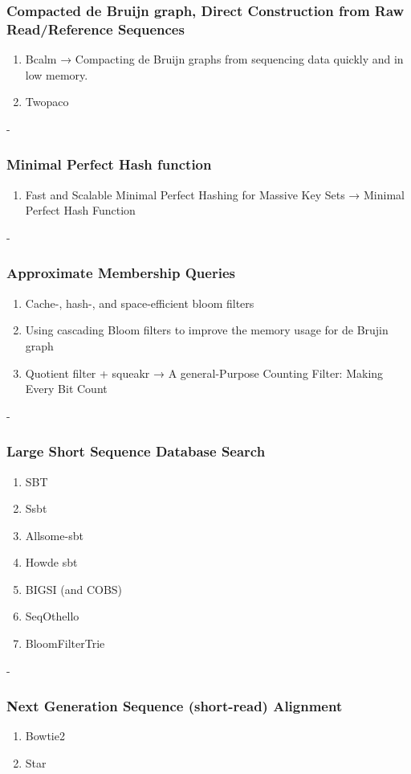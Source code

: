 \subsubsection{Compacted de Bruijn graph, Direct Construction from Raw Read/Reference Sequences}
\begin{enumerate}
    \item Bcalm → Compacting de Bruijn graphs from sequencing data quickly and in low memory.
    \item Twopaco
\end{enumerate}
-\subsubsection{Minimal Perfect Hash function}
\begin{enumerate}
    \item Fast and Scalable Minimal Perfect Hashing for Massive Key Sets → Minimal Perfect Hash Function
\end{enumerate}
-\subsubsection{Approximate Membership Queries}
\begin{enumerate}
    \item Cache-, hash-, and space-efficient bloom filters
    \item Using cascading Bloom filters to improve the memory usage for de Brujin graph
    \item Quotient filter + squeakr → A general-Purpose Counting Filter: Making Every Bit Count
\end{enumerate}
-\subsubsection{Large Short Sequence Database Search}
\begin{enumerate}
    \item SBT
    \item Ssbt
    \item Allsome-sbt
    \item Howde sbt
    \item BIGSI (and COBS)
    \item SeqOthello
    \item BloomFilterTrie
\end{enumerate}
-\subsubsection{Next Generation Sequence (short-read) Alignment}
\begin{enumerate}
    \item Bowtie2
    \item Star
\end{enumerate}
